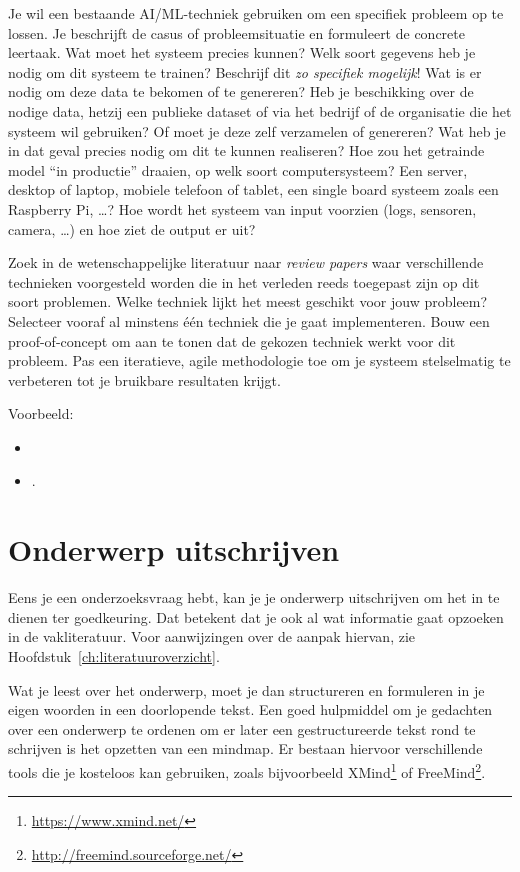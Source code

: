 Je wil een bestaande AI/ML-techniek gebruiken om een specifiek probleem op te lossen. Je beschrijft de casus of probleemsituatie en formuleert de concrete leertaak. Wat moet het systeem precies kunnen? Welk soort gegevens heb je nodig om dit systeem te trainen? Beschrijf dit \emph{zo specifiek mogelijk}! Wat is er nodig om deze data te bekomen of te genereren? Heb je beschikking over de nodige data, hetzij een publieke dataset of via het bedrijf of de organisatie die het systeem wil gebruiken? Of moet je deze zelf verzamelen of genereren? Wat heb je in dat geval precies nodig om dit te kunnen realiseren? Hoe zou het getrainde model ``in productie'' draaien, op welk soort computersysteem? Een server, desktop of laptop, mobiele telefoon of tablet, een single board systeem zoals een Raspberry Pi, \ldots? Hoe wordt het systeem van input voorzien (logs, sensoren, camera, \ldots) en hoe ziet de output er uit?

Zoek in de wetenschappelijke literatuur naar \emph{review papers} waar verschillende technieken voorgesteld worden die in het verleden reeds toegepast zijn op dit soort problemen. Welke techniek lijkt het meest geschikt voor jouw probleem? Selecteer vooraf al minstens één techniek die je gaat implementeren. Bouw een proof-of-con\-cept om aan te tonen dat de gekozen techniek werkt voor dit probleem. Pas een iteratieve, agile methodologie toe om je systeem stelselmatig te verbeteren tot je bruikbare resultaten krijgt.

Voorbeeld:

\begin{itemize}
  \item {} \autocite{Opsommer2020}
  \item {} \autocite{Cluyse2023}.
\end{itemize}

\section{Onderwerp uitschrijven}%
\label{sec:onderwerp_uitschrijven}

Eens je een onderzoeksvraag hebt, kan je je onderwerp uitschrijven om het in te dienen ter goedkeuring. Dat betekent dat je ook al wat informatie gaat opzoeken in de vakliteratuur. Voor aanwijzingen over de aanpak hiervan, zie Hoofdstuk~\ref{ch:literatuuroverzicht}.

Wat je leest over het onderwerp, moet je dan structureren en formuleren in je eigen woorden in een doorlopende tekst. Een goed hulpmiddel om je gedachten over een onderwerp te ordenen om er later een gestructureerde tekst rond te schrijven is het opzetten van een mindmap. Er bestaan hiervoor verschillende tools die je kosteloos kan gebruiken, zoals bijvoorbeeld XMind\footnote{\url{https://www.xmind.net/}} of FreeMind\footnote{\url{http://freemind.sourceforge.net/}}.

